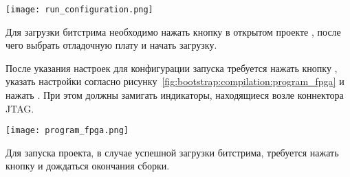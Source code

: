 \begin{center}
  \centering
  \texttt{[image: run\_configuration.png]}
  \label{fig:bootstrap:compilation:run_configuration}
\end{center}

Для загрузки битстрима необходимо нажать кнопку  в
открытом проекте , после чего выбрать отладочную плату и начать загрузку.

После указания настроек для конфигурации запуска требуется нажать кнопку ,
указать настройки согласно рисунку~\ref{fig:bootstrap:compilation:program_fpga} и нажать
. При этом должны замигать индикаторы, находящиеся возле коннектора JTAG.

\begin{center}
  \centering
  \texttt{[image: program\_fpga.png]}
  \label{fig:bootstrap:compilation:program_fpga}
\end{center}

Для запуска проекта, в случае успешной загрузки битстрима, требуется нажать кнопку  и
дождаться окончания сборки.
